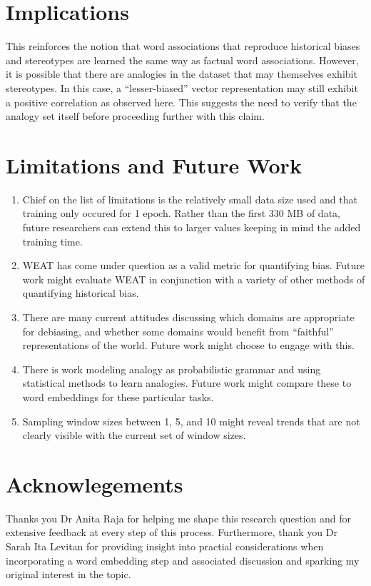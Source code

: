 \documentclass[11pt,a4paper]{article}
\begin{document}
\section{Implications}

This reinforces the notion that word associations that reproduce historical
biases and stereotypes are learned the same way as factual word associations.
However, it is possible that there are analogies in the dataset that may
themselves exhibit stereotypes. In this case, a ``lesser-biased'' vector
representation may still exhibit a positive correlation as observed here. This
suggests the need to verify that the analogy set itself before proceeding
further with this claim.

\section{Limitations and Future Work}

\begin{enumerate}

  \item Chief on the list of limitations is the relatively small data size used and that
        training only occured for 1 epoch. Rather than the first 330 MB of data, future
        researchers can extend this to larger values keeping in mind the added training
        time.

  \item WEAT has come under question as a valid metric for quantifying bias. Future work
        might evaluate WEAT in conjunction with a variety of other methods of
        quantifying historical bias.

  \item There are many current attitudes discussing which domains are appropriate for
        debiasing, and whether some domains would benefit from ``faithful''
        representations of the world. Future work might choose to engage with this.

  \item There is work modeling analogy as probabilistic grammar and using statistical
        methods to learn analogies. Future work might compare these to word embeddings
        for these particular tasks.
  \item Sampling window sizes between 1, 5, and 10 might reveal trends that are
  not clearly visible with the current set of window sizes.
\end{enumerate}

\section{Acknowlegements}

Thanks you Dr Anita Raja for helping me shape this research question and for
extensive feedback at every step of this process. Furthermore, thank you Dr
Sarah Ita Levitan for providing insight into practial considerations when
incorporating a word embedding step and associated discussion and sparking my
original interest in the topic.




\end{document}
